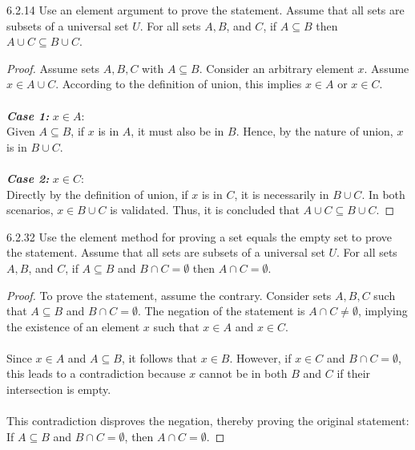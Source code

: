\begin{question}
    {6.2.14}
    {
        Use an element argument to prove the statement.
        Assume that all sets are subsets of a universal set $U$.
        For all sets $A, B$, and $C$, if $A \subseteq B$ then $A \cup C \subseteq B \cup C$.
    }
\end{question}
\begin{proof}
    Assume sets \(A, B, C\) with \(A \subseteq B\). Consider an arbitrary element \(x\). Assume \(x \in A \cup C\). According to the definition of union, this implies \(x \in A\) or \(x \in C\). \\ \\
    \textbf{\textit{Case 1:}} \(x \in A\): \\
    Given \(A \subseteq B\), if \(x\) is in \(A\), it must also be in \(B\). Hence, by the nature of union, \(x\) is in \(B \cup C\). \\ \\
    \textbf{\textit{Case 2:}} \(x \in C\): \\
    Directly by the definition of union, if \(x\) is in \(C\), it is necessarily in \(B \cup C\).
    In both scenarios, \(x \in B \cup C\) is validated. Thus, it is concluded that \(A \cup C \subseteq B \cup C\).
\end{proof}

\begin{question}
    {6.2.32}
    {
        Use the element method for proving a set equals the empty set to prove the statement.
        Assume that all sets are subsets of a universal set $U$.
        For all sets $A, B$, and $C$, if $A \subseteq B$ and $B \cap C=\emptyset$ then $A \cap C=\emptyset$.
    }
\end{question}
\begin{proof}
    To prove the statement, assume the contrary. Consider sets \(A, B, C\) such that \(A \subseteq B\) and \(B \cap C = \emptyset\). The negation of the statement is \(A \cap C \neq \emptyset\), implying the existence of an element \(x\) such that \(x \in A\) and \(x \in C\). \\ \\
    Since \(x \in A\) and \(A \subseteq B\), it follows that \(x \in B\). However, if \(x \in C\) and \(B \cap C = \emptyset\), this leads to a contradiction because \(x\) cannot be in both \(B\) and \(C\) if their intersection is empty. \\ \\
    This contradiction disproves the negation, thereby proving the original statement: If \(A \subseteq B\) and \(B \cap C = \emptyset\), then \(A \cap C = \emptyset\).
\end{proof}


